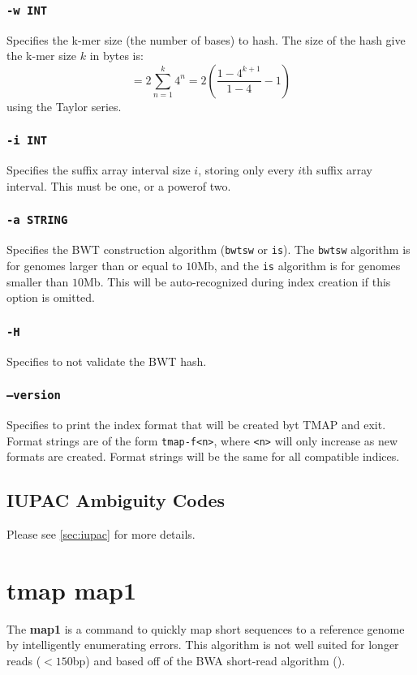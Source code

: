 \documentclass[a4paper,12pt]{book}
\newcommand{\TT}[1]{{\tt #1}} %
\newcommand{\BF}[1]{{\bf #1}} %
\begin{document}
\subsubsection{\TT{-w INT}}
Specifies the k-mer size (the number of bases) to hash.
The size of the hash give the k-mer size $k$ in bytes is:
\[
= 2 \sum_{n=1}^{k} 4^{n}
= 2 \left(\frac{1 - 4^{k+1}}{1-4} - 1\right)
\]
using the Taylor series.

\subsubsection{\TT{-i INT}}
Specifies the suffix array interval size $i$, storing only every $i$th suffix array interval.
This must be one, or a powerof two.

\subsubsection{\TT{-a STRING}}
Specifies the BWT construction algorithm (\TT{bwtsw} or \TT{is}).
The \TT{bwtsw} algorithm is for genomes larger than or equal to $10$Mb, and the \TT{is} algorithm is for genomes smaller than $10$Mb.
This will be auto-recognized during index creation if this option is omitted.

\subsubsection{\TT{-H}}
Specifies to not validate the BWT hash.

\subsubsection{\TT{--version}}
Specifies to print the index format that will be created byt TMAP and exit.
Format strings are of the form \TT{tmap-f<n>}, where \TT{<n>} will only increase as new formats are created.
Format strings will be the same for all compatible indices.
\subsection{IUPAC Ambiguity Codes}
Please see \autoref{sec:iupac} for more details. 

\section{tmap map1}
\label{sec:map1}
The \BF{map1} is a command to quickly map short sequences to a reference genome by intelligently enumerating errors.
This algorithm is not well suited for longer reads ($<150$bp) and based off of the BWA short-read algorithm (\cite{BWA-short}).
\end{document}
